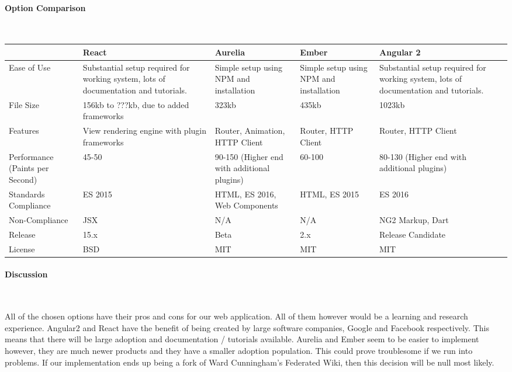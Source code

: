 \documentclass[letterpaper, 10pt, draftclsnofoot, compsoc, onecolumn]{IEEEtran}
\begin{document}
{{ \par}


\newpage
\paragraph{Option Comparison} ~\\
\vspace{1pc}
\tablehead{}
\begin{supertabular}{|p{2cm}|p{2.5cm}|p{2.5cm}|p{2.5cm}|p{2.5cm}|}
\hline \cite{Eisenberg} & React & Aurelia  & Ember  & Angular 2 \\ \hline
Ease of Use & Substantial setup required for working system, lots of documentation and tutorials. & Simple setup using NPM and installation     & Simple setup using NPM and installation & Substantial setup required for working system, lots of documentation and tutorials. \\ \hline
File Size & 156kb to ???kb, due to added frameworks & 323kb & 435kb                                   & 1023kb \\ \hline
Features & View rendering engine with plugin frameworks & Router, Animation, HTTP Client & Router, HTTP Client & Router, HTTP Client                                                                 \\ \hline
Performance (Paints per Second) & 45-50 & 90-150 (Higher end with additional plugins) & 60-100 & 80-130 (Higher end with additional plugins) \\ \hline
Standards Compliance & ES 2015 & HTML, ES 2016, Web Components & HTML, ES 2015                           & ES 2016\\ \hline
Non-Compliance & JSX                                                                                 & N/A & N/A & NG2 Markup, Dart \\ \hline
Release & 15.x & Beta & 2.x  & Release Candidate \\ \hline
License & BSD & MIT & MIT & MIT \\ \hline
\end{supertabular}

\newpage
\paragraph{Discussion} ~\\
{\noindent All of the chosen options have their pros and cons for our web application. All of them however would be a learning and research experience. Angular2 and React have the benefit of being created by large software companies, Google and Facebook respectively. This means that there will be large adoption and documentation / tutorials available. Aurelia and Ember seem to be easier to implement however, they are much newer products and they have a smaller adoption population. This could prove troublesome if we run into problems. If our implementation ends up being a fork of Ward Cunningham's Federated Wiki, then this decision will be null most likely. \par}

}
\end{document}
